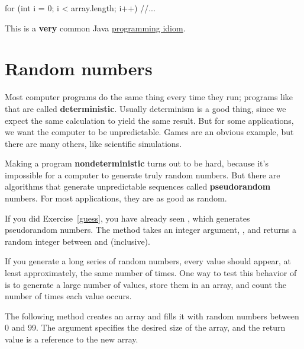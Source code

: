\begin{code}
for (int i = 0; i < array.length; i++) {
   //...
}
\end{code}

This is a \textbf{very} common Java \href{https://en.wikipedia.org/wiki/Programming_idiom}{programming idiom}.


\section{Random numbers}
\label{random}


Most computer programs do the same thing every time they run; programs like that are called {\bf deterministic}.
Usually determinism is a good thing, since we expect the same calculation to yield the same result.
But for some applications, we want the computer to be unpredictable.
Games are an obvious example, but there are many others, like scientific simulations.



Making a program {\bf nondeterministic} turns out to be hard, because it's impossible for a computer to generate truly random numbers.
But there are algorithms that generate unpredictable sequences called {\bf pseudorandom} numbers.
For most applications, they are as good as random.



If you did Exercise~\ref{guess}, you have already seen , which generates pseudorandom numbers.
The method  takes an integer argument, , and returns a random integer between  and  (inclusive).

If you generate a long series of random numbers, every value should appear, at least approximately, the same number of times.
One way to test this behavior of  is to generate a large number of values, store them in an array, and count the number of times each value occurs.

The following method creates an  array and fills it with random numbers between 0 and 99.
The argument specifies the desired size of the array, and the return value is a reference to the new array.

